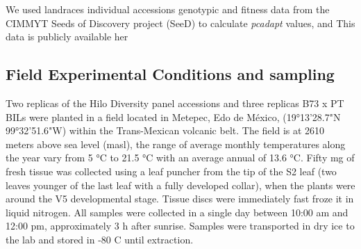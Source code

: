 \documentclass[9pt,twocolumn,twoside]{BioRxiv}
\begin{document}
We used landraces individual accessions genotypic and fitness data from the CIMMYT Seeds of Discovery project (SeeD) to calculate \textit{pcadapt} values, and  This data is publicly available her


\subsection{Field Experimental Conditions and sampling} 
Two replicas of the Hilo Diversity panel accessions and three replicas B73 x PT BILs were planted in a field located in Metepec, Edo de México, (19°13'28.7"N 99°32'51.6"W) within the Trans-Mexican volcanic belt. 
The field is at 2610 meters above sea level (masl), the range of average monthly temperatures along the year vary from 5 °C to 21.5 °C with an average annual of 13.6 °C.  
Fifty mg of fresh tissue was collected using a leaf puncher from the tip of the S2 leaf (two leaves younger of the last leaf with a fully developed collar), when the plants were around the V5 developmental stage. 
Tissue discs were immediately fast froze it in liquid nitrogen. All samples were collected in a single day between 10:00 am and 12:00 pm, approximately 3 h after sunrise. 
Samples were transported in dry ice to the lab and stored in -80 C until extraction. 
\end{document}
